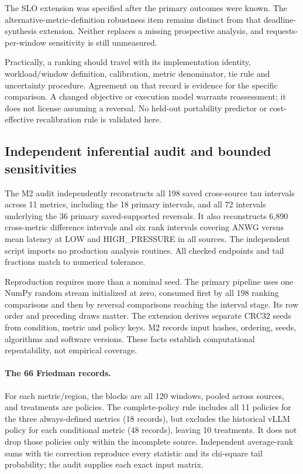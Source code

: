 The SLO extension was specified after the primary outcomes were known.
The alternative-metric-definition robustness item remains distinct from
that deadline-synthesis extension. Neither replaces a missing prospective
analysis, and requests-per-window sensitivity is still unmeasured.

Practically, a ranking should travel with its implementation identity,
workload/window definition, calibration, metric denominator, tie rule and
uncertainty procedure. Agreement on that record is evidence for the
specific comparison. A changed objective or execution model warrants
reassessment; it does not license assuming a reversal. No held-out
portability predictor or cost-effective recalibration rule is validated here.

\subsection{Independent inferential audit and bounded sensitivities}
\label{sec:audit-sensitivity}
The M2 audit independently reconstructs all 198 saved cross-source tau
intervals across 11 metrics, including the 18 primary intervals, and all
72 intervals underlying the 36 primary saved-supported reversals. It also
reconstructs 6,890 cross-metric difference intervals and six rank intervals
covering ANWG versus mean latency at LOW and HIGH\_PRESSURE in all sources.
The independent script imports no production analysis routines. All
checked endpoints and tail fractions match to numerical tolerance.

Reproduction requires more than a nominal seed. The primary pipeline uses
one NumPy random stream initialized at zero, consumed first by all 198
ranking comparisons and then by reversal comparisons reaching the interval
stage. Its row order and preceding draws matter. The extension derives
separate CRC32 seeds from condition, metric and policy keys. M2 records
input hashes, ordering, seeds, algorithms and software versions. These
facts establish computational repeatability, not empirical coverage.

\paragraph{The 66 Friedman records.}
For each metric/region, the blocks are all 120 windows, pooled across
sources, and treatments are policies. The complete-policy rule includes
all 11 policies for the three always-defined metrics (18 records), but
excludes the historical vLLM policy for each conditional metric (48
records), leaving 10 treatments. It does not drop those policies only
within the incomplete source. Independent average-rank sums with tie
correction reproduce every statistic and its chi-square tail probability;
the audit supplies each exact input matrix.

